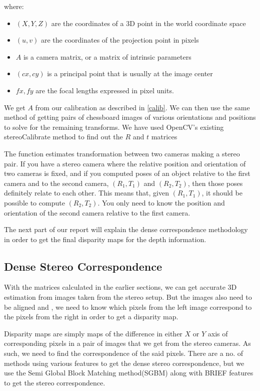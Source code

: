 \documentclass[11pt]{report}
\begin{document}
where:
\begin{itemize}



  \item      $(X, Y, Z)$ are the coordinates of a 3D point in the world coordinate space
  \item      $(u, v)$ are the coordinates of the projection point in pixels
  \item      $A$ is a camera matrix, or a matrix of intrinsic parameters
  \item      $(cx, cy)$ is a principal point that is usually at the image center
  \item      $fx, fy$ are the focal lengths expressed in pixel units.

\end{itemize}

We get $A$ from our calibration as described in \ref{calib}. We can then use the same method of getting pairs of chessboard images of various orientations and positions to solve for the remaining transforms. We have used OpenCV's existing stereoCalibrate method to find out the $R$ and $t$ matrices\cite{opencvdoc} 

The function estimates transformation between two cameras making a stereo pair. If you have a stereo camera where the relative position and orientation of two cameras is fixed, and if you computed poses of an object relative to the first camera and to the second camera, $(R_1, T_1)$ and $(R_2, T_2)$, then those poses definitely relate to each other. This means that, given $( R_1,T_1 )$, it should be possible to compute $( R_2,T_2 )$. You only need to know the position and orientation of the second camera relative to the first camera.

The next part of our report will explain the dense correspondence methodology in order to get the final disparity maps for the depth information.

\newpage
\subsection{Dense Stereo Correspondence}

With the matrices calculated in the earlier sections, we can get accurate 3D estimation from images taken from the stereo setup. But the images also need to be aligned and , we need to know which pixels from the left image correspond to the pixels from the right in order to get a disparity map. 

Disparity maps are simply maps of the difference in either $X$ or $Y$ axis of corresponding pixels in a pair of images that we get from the stereo cameras. As such, we need to find the correspondence of the said pixels. There are a no. of methods using various features to get the dense stereo correspondence, but we use the Semi Global Block Matching method(SGBM)\cite{hirschmuller2008stereo} along with BRIEF features\cite{brief} to get the stereo correspondence.
\end{document}

